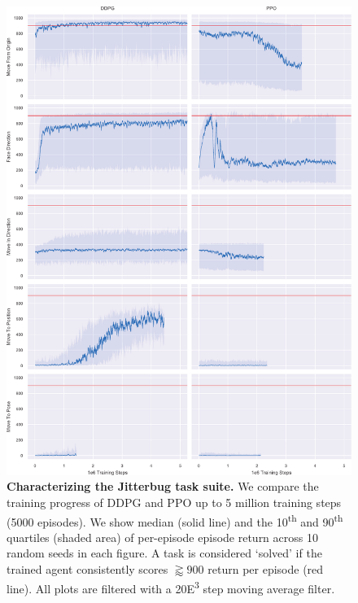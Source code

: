 \documentclass[letterpaper, 10 pt, conference]{ieeeconf}
\begin{document}

\begin{figure}[p]
    
    \centering
    \includegraphics[height=0.94\textheight]{fig-rl-perf}
    
    \caption{
        \textbf{Characterizing the Jitterbug task suite.}
        We compare the training progress of DDPG and PPO up to 5 million training steps (5000 episodes).
        We show median (solid line) and the 10\textsuperscript{th} and 90\textsuperscript{th} quartiles (shaded area) of per-episode episode return across 10 random seeds in each figure.
        A task is considered `solved' if the trained agent consistently scores $\gtrapprox 900$ return per episode (red line).
        All plots are filtered with a 20{\tiny E}\textsuperscript{3} step moving average filter.
    }
    
    \label{fig:rl-perf}
\end{figure}
\end{document}
